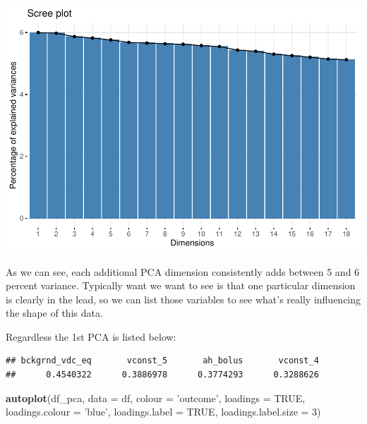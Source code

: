 \documentclass[
  11pt,
]{article}
\newenvironment{Shaded}{\begin{snugshade}}{\end{snugshade}}
\newcommand{\DataTypeTok}[1]{\textcolor[rgb]{0.13,0.29,0.53}{#1}}
\newcommand{\DecValTok}[1]{\textcolor[rgb]{0.00,0.00,0.81}{#1}}
\newcommand{\KeywordTok}[1]{\textcolor[rgb]{0.13,0.29,0.53}{\textbf{#1}}}
\newcommand{\NormalTok}[1]{#1}
\newcommand{\OperatorTok}[1]{\textcolor[rgb]{0.81,0.36,0.00}{\textbf{#1}}}
\newcommand{\OtherTok}[1]{\textcolor[rgb]{0.56,0.35,0.01}{#1}}
\newcommand{\StringTok}[1]{\textcolor[rgb]{0.31,0.60,0.02}{#1}}
\begin{document}
\begin{flushleft}\includegraphics{Project-5-MTW_files/figure-latex/unnamed-chunk-4-1} \end{flushleft}

As we can see, each additional PCA dimension consistently adds between 5
and 6 percent variance. Typically want we want to see is that one
particular dimension is clearly in the lead, so we can list those
variables to see what's really influencing the shape of this data.

Regardless the 1st PCA is listed below:

\begin{Shaded}
\end{Shaded}

\begin{verbatim}
## bckgrnd_vdc_eq       vconst_5       ah_bolus       vconst_4 
##      0.4540322      0.3886978      0.3774293      0.3288626
\end{verbatim}

\begin{Shaded}
\begin{Highlighting}[]
\KeywordTok{autoplot}\NormalTok{(df_pca, }\DataTypeTok{data =}\NormalTok{ df, }\DataTypeTok{colour =} \StringTok{'outcome'}\NormalTok{,}
         \DataTypeTok{loadings =} \OtherTok{TRUE}\NormalTok{, }\DataTypeTok{loadings.colour =} \StringTok{'blue'}\NormalTok{,}
         \DataTypeTok{loadings.label =} \OtherTok{TRUE}\NormalTok{, }\DataTypeTok{loadings.label.size =} \DecValTok{3}\NormalTok{)}
\end{Highlighting}
\end{Shaded}
\end{document}
